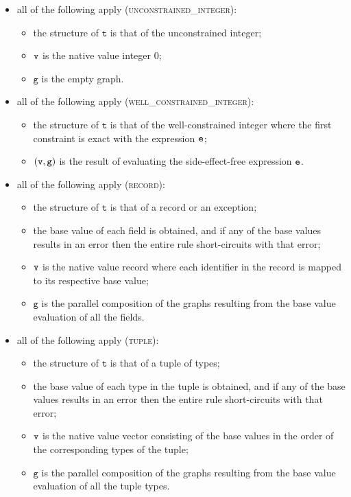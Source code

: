 \documentclass{book}
\newcommand\vg[0]{\texttt{g}}
\newcommand\vt[0]{\texttt{t}}
\begin{document}
\begin{itemize}
  \item all of the following apply (\textsc{unconstrained\_integer}):
  \begin{itemize}
    \item the structure of $\vt$ is that of the unconstrained integer;
    \item $\texttt{v}$ is the native value integer $0$;
    \item $\vg$ is the empty graph.
  \end{itemize}

  \item all of the following apply (\textsc{well\_constrained\_integer}):
  \begin{itemize}
    \item the structure of $\vt$ is that of the well-constrained integer where the first constraint
    is exact with the expression $\texttt{e}$;
    \item $(\vv, \vg)$ is the result of evaluating the side-effect-free expression $\texttt{e}$.
  \end{itemize}

  \item all of the following apply (\textsc{record}):
  \begin{itemize}
    \item the structure of $\vt$ is that of a record or an exception;
    \item the base value of each field is obtained, and if any of the base values results in an error
    then the entire rule short-circuits with that error;
    \item $\texttt{v}$ is the native value record where each identifier in the record is mapped to its
    respective base value;
    \item $\vg$ is the parallel composition of the graphs resulting from the base value evaluation
    of all the fields.
  \end{itemize}

  \item all of the following apply (\textsc{tuple}):
  \begin{itemize}
    \item the structure of $\vt$ is that of a tuple of types;
    \item the base value of each type in the tuple is obtained, and if any of the base values results in an error
    then the entire rule short-circuits with that error;
    \item $\texttt{v}$ is the native value vector consisting of the base values in the order of the corresponding types
    of the tuple;
    \item $\vg$ is the parallel composition of the graphs resulting from the base value evaluation
    of all the tuple types.
  \end{itemize}


\end{itemize}
\end{document}
